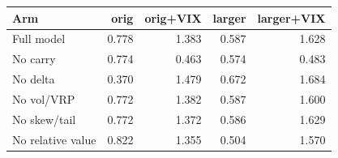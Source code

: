 \begin{tabular}{lrrrr}
\toprule
Arm & orig & orig+VIX & larger & larger+VIX \\
\midrule
Full model & 0.778 & 1.383 & 0.587 & 1.628 \\
No carry & 0.774 & 0.463 & 0.574 & 0.483 \\
No delta & 0.370 & 1.479 & 0.672 & 1.684 \\
No vol/VRP & 0.772 & 1.382 & 0.587 & 1.600 \\
No skew/tail & 0.772 & 1.372 & 0.586 & 1.629 \\
No relative value & 0.822 & 1.355 & 0.504 & 1.570 \\
\bottomrule
\end{tabular}
